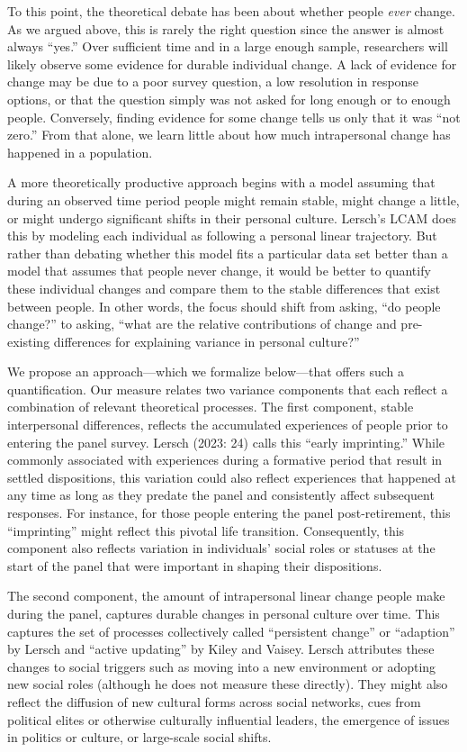 \documentclass[
  12pt,
]{article}
\begin{document}
To this point, the theoretical debate has been about whether people
\emph{ever} change. As we argued above, this is rarely the right
question since the answer is almost always ``yes.'' Over sufficient time
and in a large enough sample, researchers will likely observe some
evidence for durable individual change. A lack of evidence for change
may be due to a poor survey question, a low resolution in response
options, or that the question simply was not asked for long enough or to
enough people. Conversely, finding evidence for some change tells us
only that it was ``not zero.'' From that alone, we learn little about
how much intrapersonal change has happened in a population.

A more theoretically productive approach begins with a model assuming
that during an observed time period people might remain stable, might
change a little, or might undergo significant shifts in their personal
culture. Lersch's LCAM does this by modeling each individual as
following a personal linear trajectory. But rather than debating whether
this model fits a particular data set better than a model that assumes
that people never change, it would be better to quantify these
individual changes and compare them to the stable differences that exist
between people. In other words, the focus should shift from asking, ``do
people change?'' to asking, ``what are the relative contributions of
change and pre-existing differences for explaining variance in personal
culture?''

We propose an approach---which we formalize below---that offers such a
quantification. Our measure relates two variance components that each
reflect a combination of relevant theoretical processes. The first
component, stable interpersonal differences, reflects the accumulated
experiences of people prior to entering the panel survey. Lersch (2023:
24) calls this ``early imprinting.'' While commonly associated with
experiences during a formative period that result in settled
dispositions, this variation could also reflect experiences that
happened at any time as long as they predate the panel and consistently
affect subsequent responses. For instance, for those people entering the
panel post-retirement, this ``imprinting'' might reflect this pivotal
life transition. Consequently, this component also reflects variation in
individuals' social roles or statuses at the start of the panel that
were important in shaping their dispositions.

The second component, the amount of intrapersonal linear change people
make during the panel, captures durable changes in personal culture over
time. This captures the set of processes collectively called
``persistent change'' or ``adaption'' by Lersch and ``active updating''
by Kiley and Vaisey. Lersch attributes these changes to social triggers
such as moving into a new environment or adopting new social roles
(although he does not measure these directly). They might also reflect
the diffusion of new cultural forms across social networks, cues from
political elites or otherwise culturally influential leaders, the
emergence of issues in politics or culture, or large-scale social
shifts.
\end{document}
